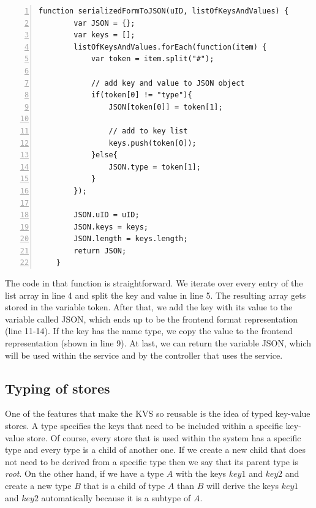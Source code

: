\begin{lstlisting}[numbers=left,caption={The translation from the backend data format to the frontend data format within the key value service},label=keyTranslation,frame=tlbr,breaklines]
   function serializedFormToJSON(uID, listOfKeysAndValues) {
        var JSON = {};
        var keys = [];
        listOfKeysAndValues.forEach(function(item) {
            var token = item.split("#");

            // add key and value to JSON object
            if(token[0] != "type"){
                JSON[token[0]] = token[1];

                // add to key list
                keys.push(token[0]);
            }else{
                JSON.type = token[1];
            }
        });

        JSON.uID = uID;
        JSON.keys = keys;
        JSON.length = keys.length;
        return JSON;
    }
\end{lstlisting}

The code in that function is straightforward. We iterate over every entry of the list array in line 4 and split the key and value in line 5. The resulting array gets stored in the variable token.
After that, we add the key with its value to the variable called JSON, which ends up to be the frontend format representation (line 11-14). If the key has the name type, we copy the value to the frontend representation (shown in line 9). At last, we can return the variable JSON, which will be used within the service and by the controller that uses the service.

\subsection{Typing of stores}
\label{typedKVS}
One of the features that make the \ac{KVS} so reusable is the idea of typed key-value stores. A type specifies the keys that need to be included within a specific key-value store. Of course, every store that is used within the system has a specific type and every type is a child of another one. If we create a new child that does not need to be derived from a specific type then we say that its parent type is \emph{root}.
On the other hand, if we have a type $A$ with the keys $key1$ and $key2$ and create a new type $B$ that is a child of type $A$ than $B$ will derive the keys $key1$ and $key2$ automatically because it is a subtype of $A$.

